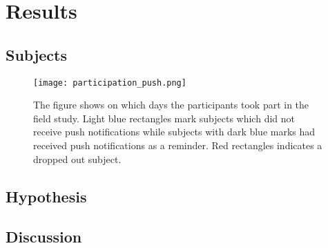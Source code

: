 \chapter{Results\label{cha:chapter6}}
\section{Subjects}
\begin{figure}[h!]
  \centering
  \texttt{[image: participation\_push.png]}
  \caption{The figure shows on which days the participants took part in the field study. Light blue rectangles mark subjects which did not receive push notifications while subjects with dark blue marks had received push notifications as a reminder. Red rectangles indicates a dropped out subject.} \label{fig:erdiagram}
\end{figure}
\section{Hypothesis}
\section{Discussion}
